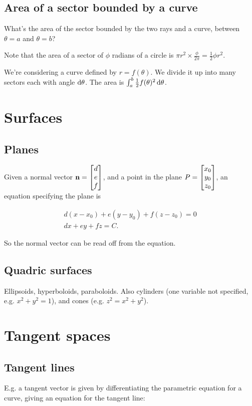 \documentclass[12pt]{article}
\begin{document}
\subsection*{Area of a sector bounded by a curve}

What's the area of the sector bounded by the two rays and a curve, between $\theta=a$ and $\theta=b$?

Note that the area of a sector of $\phi$ radians of a circle is $\pi r^2 \times \frac{\phi}{2\pi} = \frac{1}{2}\phi r^2$.

We're considering a curve defined by $r = f(\theta)$. We divide it up into many
sectors each with angle $\operatorname{\text{d}\theta}$. The area is
$\int_a^b \frac{1}{2}f(\theta)^2\operatorname{\text{d}\theta}$.

\section*{Surfaces}

\subsection*{Planes}
Given a normal vector $\mathbf{n} = \begin{bmatrix}d\\e\\f\end{bmatrix}$, and a point in the plane
$P = \begin{bmatrix}x_0\\y_0\\z_0\end{bmatrix}$, an equation specifying the plane is

\begin{align*}
  d(x - x_0) + e(y - y_0) + f(z - z_0) = 0 \\
  dx + ey + fz = C.
\end{align*}

So the normal vector can be read off from the equation.

\subsection*{Quadric surfaces}
Ellipsoids, hyperboloids, paraboloids. Also cylinders (one variable not
specified, e.g. $x^2 + y^2 = 1$), and cones (e.g. $z^2 = x^2 + y^2$).

\section*{Tangent spaces}

\subsection*{Tangent lines}
E.g. a tangent vector is given by differentiating the parametric equation for a
curve, giving an equation for the tangent line:
\end{document}
